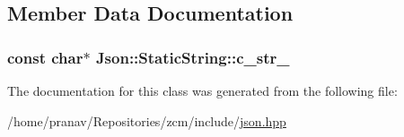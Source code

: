 \subsection{Member Data Documentation}
\subsubsection[{\texorpdfstring{c\+\_\+str\+\_\+}{c_str_}}]{\setlength{\rightskip}{0pt plus 5cm}const char$\ast$ Json\+::\+Static\+String\+::c\+\_\+str\+\_\+\hspace{0.3cm}{\ttfamily [private]}}\hypertarget{classJson_1_1StaticString_a9f0d9e8caee8f8db14e2c8c24760dffd}{}\label{classJson_1_1StaticString_a9f0d9e8caee8f8db14e2c8c24760dffd}


The documentation for this class was generated from the following file\+:\begin{DoxyCompactItemize}
\item 
/home/pranav/\+Repositories/zcm/include/\hyperlink{json_8hpp}{json.\+hpp}\end{DoxyCompactItemize}
